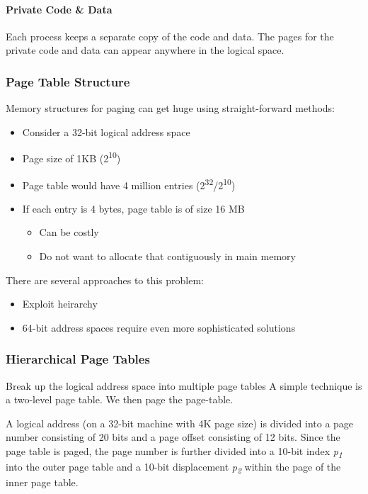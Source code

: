 \documentclass{article}%
\begin{document}
\paragraph{Private Code \& Data}
\label{sec:org88ca9e7}
Each process keeps a separate copy of the code and data.
The pages for the private code and data can appear anywhere in the logical space.
\subsubsection{Page Table Structure}
\label{sec:orgc7af461}
Memory structures for paging can get huge using straight-forward methods:
\begin{itemize}
\item Consider a 32-bit logical address space
\item Page size of 1KB (2\textsuperscript{10})
\item Page table would have 4 million entries (2\textsuperscript{32}/2\textsuperscript{10})
\item If each entry is 4 bytes, page table is of size 16 MB
\begin{itemize}
\item Can be costly
\item Do not want to allocate that contiguously in main memory
\end{itemize}
\end{itemize}
There are several approaches to this problem:
\begin{itemize}
\item Exploit heirarchy
\item 64-bit address spaces require even more sophisticated solutions
\end{itemize}
\subsubsection{Hierarchical Page Tables}
\label{sec:orgfed115b}
Break up the logical address space into multiple page tables
A simple technique is a two-level page table.
We then page the page-table.

A logical address (on a 32-bit machine with 4K page size) is divided into a page number consisting of 20 bits and a page offset consisting of 12 bits.
Since the page table is paged, the page number is further divided into a 10-bit index \emph{p\textsubscript{1}} into the outer page table and a 10-bit displacement \emph{p\textsubscript{2}} within the page of the inner page table.

\maketitle
\end{document}
